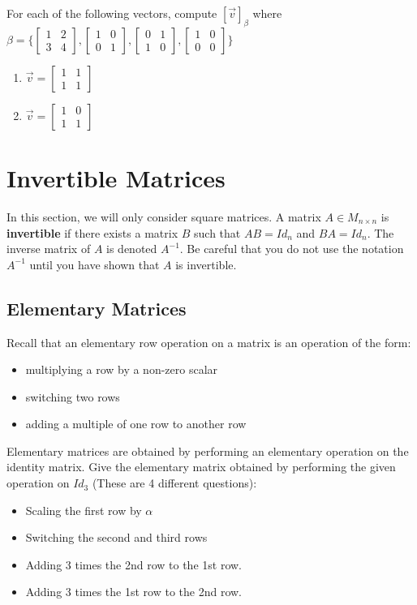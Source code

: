 \bq For each of the following vectors, compute $[\vec{v}]_{\beta}$ where $\beta =\{ \begin{bmatrix} 1&2\\3&4  \end{bmatrix}, \begin{bmatrix} 1&0\\0&1  \end{bmatrix}, \begin{bmatrix} 0&1\\1&0  \end{bmatrix}, \begin{bmatrix} 1&0\\0&0 \end{bmatrix} \}$
\begin{enumerate}
\item $\vec{v}=\begin{bmatrix} 1&1\\1&1  \end{bmatrix}$
\item $\vec{v}=\begin{bmatrix} 1&0\\1&1  \end{bmatrix}$
\end{enumerate}
\eq


\section{Invertible Matrices}

In this section, we will only consider square matrices. A matrix $A \in M_{n \times n}$ is \textbf{invertible} if there exists a matrix $B$ such that $AB=Id_n$ and $BA=Id_n$. The inverse matrix of $A$ is denoted $A^{-1}$. Be careful that you do not use the notation $A^{-1}$ until you have shown that $A$ is invertible.

\subsection{Elementary Matrices}

Recall that an elementary row operation on a matrix is an operation of the form:

\begin{itemize}
\item multiplying a row by a non-zero scalar
\item switching two rows
\item adding a multiple of one row to another row
\end{itemize}
Elementary matrices are obtained by performing an elementary operation on the identity matrix.
\bq Give the elementary matrix obtained by performing the given operation on $Id_3$ (These are 4 different questions):
\begin{itemize}
\item Scaling the first row by $\alpha$
\item Switching the second and third rows
\item Adding 3 times the 2nd row to the 1st row.
\item Adding 3 times the 1st row to the 2nd row.
\end{itemize}
\eq

